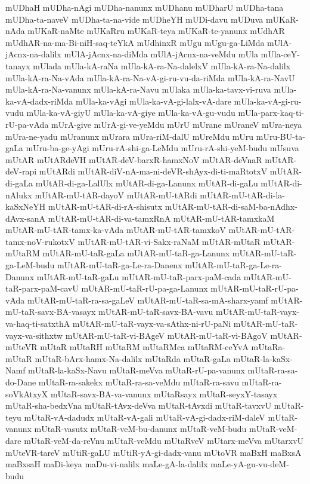 {mUDhaH
mUDha-nAgi
mUDha-nanunx
mUDhanu
mUDharU
mUDha-tana
mUDha-ta-naveV
mUDha-ta-na-vide
mUDheYH
mUDi-davu
mUDuva
mUKaR-nAda
mUKaR-naMte
mUKaRru
mUKaR-teya
mUKaR-te-yanunx
mUdhAR
mUdhAR-na-ma-Bi-niH-saq-teYkA
mUdhinxR
mUgu
mUgu-ga-LiMda
mUlA-jAcnx-na-dalilx
mUlA-jAcnx-na-diMda
mUlA-jAcnx-na-veMdu
mUla
mUla-ceY-tanayx
mUlada
mUla-kA-raNa
mUla-kA-ra-Na-dalelxV
mUla-kA-ra-Na-dalilx
mUla-kA-ra-Na-vAda
mUla-kA-ra-Na-vA-gi-ru-vu-da-riMda
mUla-kA-ra-NavU
mUla-kA-ra-Na-vanunx
mUla-kA-ra-Navu
mUlaka
mUla-ka-tavx-vi-ruva
mUla-ka-vA-dadx-riMda
mUla-ka-vAgi
mUla-ka-vA-gi-lalx-vA-dare
mUla-ka-vA-gi-ru-vudu
mUla-ka-vA-giyU
mUla-ka-vA-giye
mUla-ka-vA-gu-vudu
mUla-parx-kaq-ti-rU-pa-vAda
mUrA-give
mUrA-gi-ve-yeMdu
mUrU
mUrane
mUraneV
mUra-neya
mUra-ne-yadu
mUranunx
mUrara
mUra-riM-dalU
mUreMdu
mUru
mUru-BU-ta-gaLa
mUru-ba-ge-yAgi
mUru-rA-shi-ga-LeMdu
mUru-rA-shi-yeM-budu
mUsuva
mUtAR
mUtARdeVH
mUtAR-deV-barxR-hamxNoV
mUtAR-deVnaR
mUtAR-deV-rapi
mUtARdi
mUtAR-diV-nA-ma-ni-deVR-shAyx-di-ti-maRtotxV
mUtAR-di-gaLa
mUtAR-di-ga-LalUlx
mUtAR-di-ga-Lanunx
mUtAR-di-gaLu
mUtAR-di-nAlukx
mUtAR-mU-tAR-dayoV
mUtAR-mU-tARdi
mUtAR-mU-tAR-di-la-kaSxNeYH
mUtAR-mU-tAR-di-rA-shisutx
mUtAR-mU-tAR-di-saM-ba-nAdhx-dAvx-sanA
mUtAR-mU-tAR-di-va-tamxRnA
mUtAR-mU-tAR-tamxkaM
mUtAR-mU-tAR-tamx-ka-vAda
mUtAR-mU-tAR-tamxkoV
mUtAR-mU-tAR-tamx-noV-rukotxV
mUtAR-mU-tAR-vi-Sakx-raNaM
mUtAR-mUtaR
mUtAR-mUtaRM
mUtAR-mU-taR-gaLa
mUtAR-mU-taR-ga-Lanunx
mUtAR-mU-taR-ga-LeM-budu
mUtAR-mU-taR-ga-Le-ra-Danenx
mUtAR-mU-taR-ga-Le-ra-Danunx
mUtAR-mU-taR-gaLu
mUtAR-mU-taR-parx-paM-cada
mUtAR-mU-taR-parx-paM-cavU
mUtAR-mU-taR-rU-pa-ga-Lanunx
mUtAR-mU-taR-rU-pa-vAda
mUtAR-mU-taR-ra-sa-gaLeV
mUtAR-mU-taR-sa-mA-sharx-yamf
mUtAR-mU-taR-savx-BA-vasayx
mUtAR-mU-taR-savx-BA-vavu
mUtAR-mU-taR-vayx-va-haq-ti-satxthA
mUtAR-mU-taR-vayx-va-sAthx-ni-rU-paNi
mUtAR-mU-taR-vayx-va-sithxtw
mUtAR-mU-taR-vi-BAgeV
mUtAR-mU-taR-vi-BAgoV
mUtAR-mUteVR
mUtaR
mUtaRH
mUtaRM
mUtaRMca
mUtaRM-ceYvA
mUtaRa-mUtaR
mUtaR-bArx-hamx-Na-dalilx
mUtaRda
mUtaR-gaLa
mUtaR-la-kaSx-Namf
mUtaR-la-kaSx-Navu
mUtaR-meVva
mUtaR-rU-pa-vanunx
mUtaR-ra-sa-do-Dane
mUtaR-ra-sakekx
mUtaR-ra-sa-veMdu
mUtaR-ra-savu
mUtaR-ra-soVkAtxyX
mUtaR-savx-BA-va-vanunx
mUtaRsayx
mUtaR-seyxY-tasayx
mUtaR-sha-bedxVna
mUtaR-tAvx-deVva
mUtaR-tAvxdi
mUtaR-tavxvU
mUtaR-teyu
mUtaR-vA-dadudx
mUtaR-vA-gali
mUtaR-vA-gi-dadx-riM-daleV
mUtaR-vanunx
mUtaR-vasutx
mUtaR-veM-bu-danunx
mUtaR-veM-budu
mUtaR-veM-dare
mUtaR-veM-da-reVnu
mUtaR-veMdu
mUtaRveV
mUtarx-meVva
mUtarxvU
mUteVR-tareV
mUtiR-gaLU
mUtiR-yA-gi-dadx-vanu
mUtoVR
maBxH
maBxsA
maBxsaH
maDi-keya
maDu-vi-nalilx
maLe-gA-la-dalilx
maLe-yA-gu-vu-deM-budu
}
